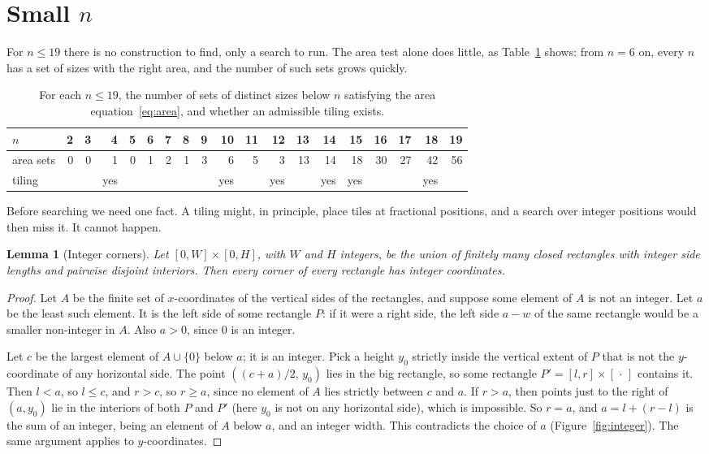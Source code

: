 \documentclass[11pt]{amsart}
\newtheorem{lem}[thm]{Lemma}
\theoremstyle{definition}
\begin{document}
\section{Small \texorpdfstring{$n$}{n}}\label{sec:small}

For $n\le19$ there is no construction to find, only a search to run. The area test alone does
little, as Table~\ref{tab:area} shows: from $n=6$ on, every $n$ has a set of sizes with the right area,
and the number of such sets grows quickly.

\begin{table}[ht]
\caption{For each $n\le19$, the number of sets of distinct sizes below $n$ satisfying the area
equation~\eqref{eq:area}, and whether an admissible tiling exists.}
\label{tab:area}
\centering\small\setlength{\tabcolsep}{3.2pt}
\begin{tabular}{l*{18}{r}}
\toprule
$n$ & 2&3&4&5&6&7&8&9&10&11&12&13&14&15&16&17&18&19\\
\midrule
area sets & 0&0&1&0&1&2&1&3&6&5&3&13&14&18&30&27&42&56\\
tiling & &&yes&&&&&&yes&&yes&&yes&yes&&&yes&\\
\bottomrule
\end{tabular}
\end{table}

Before searching we need one fact. A tiling might, in principle, place tiles at fractional
positions, and a search over integer positions would then miss it. It cannot happen.

\begin{lem}[Integer corners]\label{lem:integer}
Let $[0,W]\times[0,H]$, with $W$ and $H$ integers, be the union of finitely many closed rectangles with
integer side lengths and pairwise disjoint interiors. Then every corner of every rectangle has integer
coordinates.
\end{lem}

\begin{proof}
Let $A$ be the finite set of $x$-coordinates of the vertical sides of the rectangles, and suppose some
element of $A$ is not an integer. Let $a$ be the least such element. It is the left side of some
rectangle $P$: if it were a right side, the left side $a-w$ of the same rectangle would be a smaller
non-integer in $A$. Also $a>0$, since $0$ is an integer.

Let $c$ be the largest element of $A\cup\{0\}$ below $a$; it is an integer. Pick a height $y_0$ strictly
inside the vertical extent of $P$ that is not the $y$-coordinate of any horizontal side. The point
$((c+a)/2,\,y_0)$ lies in the big rectangle, so some rectangle $P'=[l,r]\times[\,\cdot\,]$ contains it.
Then $l<a$, so $l\le c$, and $r>c$, so $r\ge a$, since no element of $A$ lies strictly between $c$ and
$a$. If $r>a$, then points just to the right of $(a,y_0)$ lie in the interiors of both $P$ and $P'$
(here $y_0$ is not on any horizontal side), which is impossible. So $r=a$, and $a=l+(r-l)$ is the sum
of an integer, being an element of $A$ below $a$, and an integer width. This contradicts the choice of
$a$ (Figure~\ref{fig:integer}). The same argument applies to $y$-coordinates.
\end{proof}
\end{document}
